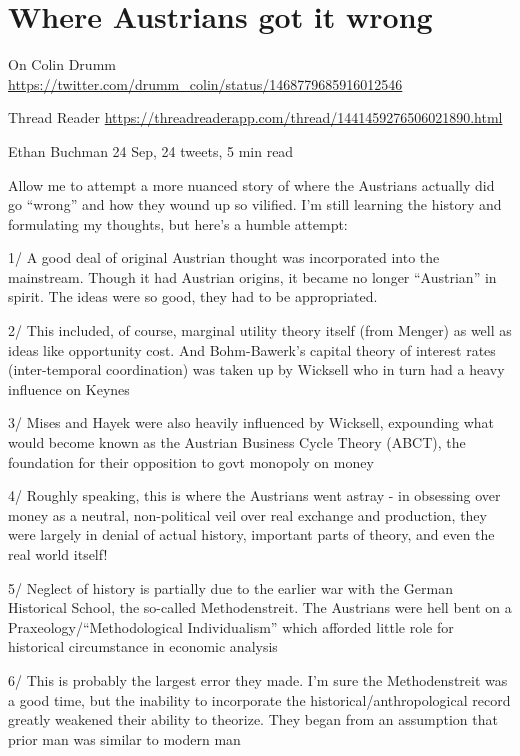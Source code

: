 \documentclass[
]{book}
\begin{document}
\hypertarget{where-austrians-got-it-wrong}{%
\section{Where Austrians got it wrong}\label{where-austrians-got-it-wrong}}

On Colin Drumm
\url{https://twitter.com/drumm_colin/status/1468779685916012546}

Thread Reader
\url{https://threadreaderapp.com/thread/1441459276506021890.html}

Ethan Buchman
24 Sep, 24 tweets, 5 min read

Allow me to attempt a more nuanced story of where the Austrians actually did go ``wrong'' and how they wound up so vilified. I'm still learning the history and formulating my thoughts, but here's a humble attempt:

1/ A good deal of original Austrian thought was incorporated into the mainstream. Though it had Austrian origins, it became no longer ``Austrian'' in spirit. The ideas were so good, they had to be appropriated.

2/ This included, of course, marginal utility theory itself (from Menger) as well as ideas like opportunity cost. And Bohm-Bawerk's capital theory of interest rates (inter-temporal coordination) was taken up by Wicksell who in turn had a heavy influence on Keynes

3/ Mises and Hayek were also heavily influenced by Wicksell, expounding what would become known as the Austrian Business Cycle Theory (ABCT), the foundation for their opposition to govt monopoly on money

4/ Roughly speaking, this is where the Austrians went astray - in obsessing over money as a neutral, non-political veil over real exchange and production, they were largely in denial of actual history, important parts of theory, and even the real world itself!

5/ Neglect of history is partially due to the earlier war with the German Historical School, the so-called Methodenstreit. The Austrians were hell bent on a Praxeology/``Methodological Individualism'' which afforded little role for historical circumstance in economic analysis

6/ This is probably the largest error they made. I'm sure the Methodenstreit was a good time, but the inability to incorporate the historical/anthropological record greatly weakened their ability to theorize. They began from an assumption that prior man was similar to modern man
\end{document}
